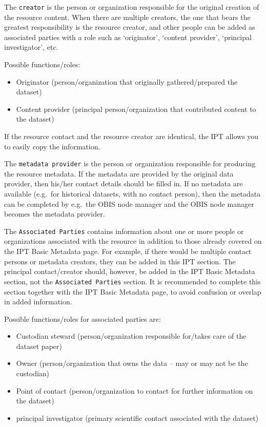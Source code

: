 \documentclass[
  letterpaper,
  DIV=11,
  numbers=noendperiod,
  oneside]{scrreprt}
\providecommand{\tightlist}{%
  \setlength{\itemsep}{0pt}\setlength{\parskip}{0pt}}\usepackage{longtable,booktabs,array}
\begin{document}
The \texttt{creator} is the person or organization responsible for the
original creation of the resource content. When there are multiple
creators, the one that bears the greatest responsibility is the resource
creator, and other people can be added as associated parties with a role
such as `originator', `content provider', `principal investigator', etc.

Possible functions/roles:

\begin{itemize}
\tightlist
\item
  Originator (person/organization that originally gathered/prepared the
  dataset)
\item
  Content provider (principal person/organization that contributed
  content to the dataset)
\end{itemize}

If the resource contact and the resource creator are identical, the IPT
allows you to easily copy the information.

The \texttt{metadata\ provider} is the person or organization
responsible for producing the resource metadata. If the metadata are
provided by the original data provider, then his/her contact details
should be filled in. If no metadata are available (e.g.~for historical
datasets, with no contact person), then the metadata can be completed by
e.g.~the OBIS node manager and the OBIS node manager becomes the
metadata provider.

The \texttt{Associated\ Parties} contains information about one or more
people or organizations associated with the resource in addition to
those already covered on the IPT Basic Metadata page. For example, if
there would be multiple contact persons or metadata creators, they can
be added in this IPT section. The principal contact/creator should,
however, be added in the IPT Basic Metadata section, not the
\texttt{Associated\ Parties} section. It is recommended to complete this
section together with the IPT Basic Metadata page, to avoid confusion or
overlap in added information.

Possible functions/roles for associated parties are:

\begin{itemize}
\tightlist
\item
  Custodian steward (person/organization responsible for/takes care of
  the dataset paper)
\item
  Owner (person/organization that owns the data -- may or may not be the
  custodian)
\item
  Point of contact (person/organization to contact for further
  information on the dataset)
\item
  principal investigator (primary scientific contact associated with the
  dataset)
\end{itemize}
\end{document}
